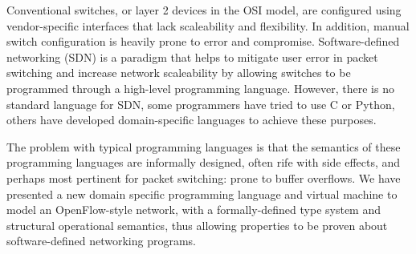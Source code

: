 \documentclass{article}
\begin{document}
Conventional switches, or layer 2 devices in the OSI model, are configured using vendor-specific interfaces that lack scaleability and flexibility. In addition, manual switch configuration is heavily prone to error and compromise. Software-defined networking (SDN) is a paradigm that helps to mitigate user error in packet switching and increase network scaleability by allowing switches to be programmed through a high-level programming language. However, there is no standard language for SDN, some programmers have tried to use C or Python, others have developed domain-specific languages to achieve these purposes.

The problem with typical programming languages is that the semantics of these programming languages are informally designed, often rife with side effects, and perhaps most pertinent for packet switching: prone to buffer overflows. We have presented a new domain specific programming language and virtual machine to model an OpenFlow-style network, with a formally-defined type system and structural operational semantics, thus allowing properties to be proven about software-defined networking programs.
\end{document}
